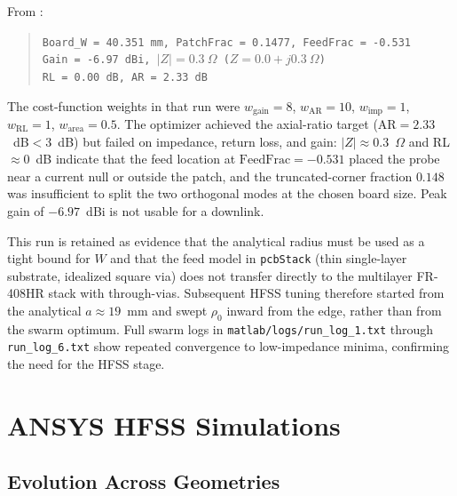 From :

\begin{quote}
\texttt{Board\_W = 40.351~mm, PatchFrac = 0.1477, FeedFrac = -0.531} \\
\texttt{Gain = -6.97~dBi, $|Z| = 0.3~\Omega$ ($Z = 0.0 + j0.3~\Omega$)} \\
\texttt{RL = 0.00~dB, AR = 2.33~dB}
\end{quote}

The cost-function weights in that run were $w_{\mathrm{gain}}=8$, $w_{\mathrm{AR}}=10$, $w_{\mathrm{imp}}=1$, $w_{\mathrm{RL}}=1$, $w_{\mathrm{area}}=0.5$. The optimizer achieved the axial-ratio target (AR${}=2.33$~dB${}<3$~dB) but failed on impedance, return loss, and gain: $|Z|\approx 0.3$~$\Omega$ and RL${}\approx 0$~dB indicate that the feed location at $\mathrm{FeedFrac}=-0.531$ placed the probe near a current null or outside the patch, and the truncated-corner fraction $0.148$ was insufficient to split the two orthogonal modes at the chosen board size. Peak gain of $-6.97$~dBi is not usable for a downlink.

This run is retained as evidence that the analytical radius must be used as a tight bound for $W$ and that the feed model in \texttt{pcbStack} (thin single-layer substrate, idealized square via) does not transfer directly to the multilayer FR-408HR stack with through-vias. Subsequent HFSS tuning therefore started from the analytical $a\approx 19$~mm and swept $\rho_0$ inward from the edge, rather than from the swarm optimum. Full swarm logs in \texttt{matlab/logs/run\_log\_1.txt} through \texttt{run\_log\_6.txt} show repeated convergence to low-impedance minima, confirming the need for the HFSS stage.

\section{ANSYS HFSS Simulations}

\subsection{Evolution Across Geometries}

